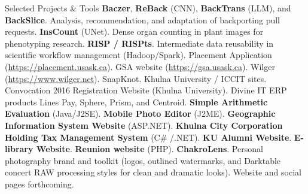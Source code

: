 \begin{rubric}{Selected Projects \& Tools}
\entry*[SE / AI]%
	\textbf{Baczer}, \textbf{ReBack} (CNN), \textbf{BackTrans} (LLM), and \textbf{BackSlice}. Analysis, recommendation, and adaptation of backporting pull requests.
\vspace{-1mm}
\entry*[Vision]%
	\textbf{InsCount} (UNet). Dense organ counting in plant images for phenotyping research.
\vspace{-1mm}
\entry*[Data]%
	\textbf{RISP / RISPts}. Intermediate data reusability in scientific workflow management (Hadoop/Spark).
\vspace{-1mm}
\entry*[Web]%
	Placement Application (\url{https://placement.usask.ca}). GSA website (\url{https://gsa.usask.ca}). Wilger (\url{https://www.wilger.net}). SnapKnot. Khulna University / ICCIT sites. Convocation 2016 Registration Website (Khulna University). Divine IT ERP products Lines Pay, Sphere, Prism, and Centroid.
\vspace{-1mm}
\entry*[Undergrad]%
	\textbf{Simple Arithmetic Evaluation} (Java/J2SE). \textbf{Mobile Photo Editor} (J2ME). \textbf{Geographic Information System Website} (ASP.NET). \textbf{Khulna City Corporation Holding Tax Management System} (C\# /.NET). \textbf{KU Alumni Website}. \textbf{E-library Website}. \textbf{Reunion website} (PHP).
\vspace{-1mm}
\entry*[Photo]%
	\textbf{ChakroLens}. Personal photography brand and toolkit (logos, outlined watermarks, and Darktable concert RAW processing styles for clean and dramatic looks). Website and social pages forthcoming.
\end{rubric}
